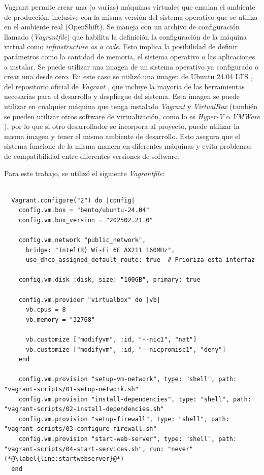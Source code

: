 Vagrant permite crear una (o varias) máquinas virtuales que emulan el ambiente de producción, inclusive con la misma versión del sistema operativo que se utiliza en el ambiente real (OpenShift). Se maneja con un archivo de configuración llamado (\textit{Vagrantfile}) que habilita la definición la configuración de la máquina virtual como \textit{infrastructure as a code}. Esto implica la posibilidad de definir parámetros como la cantidad de memoria, el sistema operativo o las aplicaciones a instalar. Se puede utilizar una imagen de un sistema operativo ya configurado o crear una desde cero. En este caso se utilizó una imagen de Ubuntu 24.04 LTS \citep{progress_chefs_bento_bentoubuntu-2404_nodate}, del repositorio oficial de \textit{Vagrant} \citep{hashicorp_hashicorp_nodate}, que incluye la mayoría de las herramientas necesarias para el desarrollo y despliegue del sistema. Esta imagen se puede utilizar en cualquier máquina que tenga instalado \textit{Vagrant} y \textit{VirtualBox} \citep{wikipedia_virtualbox_2025} (también se pueden utilizar otros software de virtualización, como lo es \textit{Hyper-V} \citep{meaghanlewis_informacion_2025} o \textit{VMWare} \citep{wikipedia_vmware_2025}), por lo que si otro desarrollador se incorpora al proyecto, puede utilizar la misma imagen y tener el mismo ambiente de desarrollo. Esto asegura que el sistema funcione de la misma manera en diferentes máquinas y evita problemas de compatibilidad entre diferentes versiones de software.

Para este trabajo, se utilizó el siguiente \textit{Vagrantfile}:

\begin{lstlisting}[label=cod:vagrantfile,caption=Configuración de Vagrant.]  % Start your code-block  
  
  Vagrant.configure("2") do |config|
    config.vm.box = "bento/ubuntu-24.04"
    config.vm.box_version = "202502.21.0"
    
    config.vm.network "public_network",
      bridge: "Intel(R) Wi-Fi 6E AX211 160MHz",
      use_dhcp_assigned_default_route: true  # Prioriza esta interfaz
  
    config.vm.disk :disk, size: "100GB", primary: true
  
    config.vm.provider "virtualbox" do |vb|
      vb.cpus = 8
      vb.memory = "32768"
      
      vb.customize ["modifyvm", :id, "--nic1", "nat"]
      vb.customize ["modifyvm", :id, "--nicpromisc1", "deny"] 
    end
  
    config.vm.provision "setup-vm-network", type: "shell", path: "vagrant-scripts/01-setup-network.sh"
    config.vm.provision "install-dependencies", type: "shell", path: "vagrant-scripts/02-install-dependencies.sh"
    config.vm.provision "setup-firewall", type: "shell", path: "vagrant-scripts/03-configure-firewall.sh"
    config.vm.provision "start-web-server", type: "shell", path: "vagrant-scripts/04-start-services.sh", run: "never" (*@\label{line:startwebserver}@*)
  end

\end{lstlisting}

